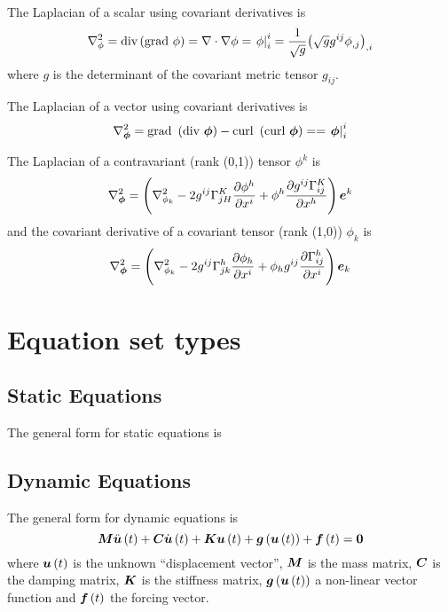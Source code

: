 The Laplacian of a scalar using covariant derivatives is
\begin{equation}
  \laplacian{\phi}=\text{div}\pbrac{\text{grad }\phi}=\divergence{}{\gradient{}{\phi}}=\mixedderiv{\phi}{i}{i}=\frac{1}{\sqrt{g}}\partialderiv{\pbrac{\sqrt{g}g^{ij}\partialderiv{\phi}{j}}}{i}
\end{equation}
where $g$ is the determinant of the covariant metric tensor $g_{ij}$.

The Laplacian of a vector using covariant derivatives is
\begin{equation}
  \laplacian{\vectr{\phi}}=\text{grad }\pbrac{\text{div }\vectr{\phi}}-\text{curl } \pbrac{\text{curl }\vectr{\phi}}==\mixedderiv{\vectr{\phi}}{i}{i}
\end{equation}

The Laplacian of a contravariant (rank (0,1)) tensor $\phi^{k}$ is
\begin{equation}
  \laplacian{\vectr{\phi}}=\pbrac{\laplacian{\phi_{k}}-2g^{ij}\christoffel{K}{j}{H}\delby{\phi^{h}}{x^{i}}+\phi^{h}\delby{g^{ij}\christoffel{K}{i}{j}}{x^{h}}}\vectr{e}^{k}
\end{equation}
and the covariant derivative of a covariant tensor  (rank (1,0)) $\phi_{k}$ is
\begin{equation}
  \laplacian{\vectr{\phi}}=\pbrac{\laplacian{\phi_{k}}-2g^{ij}\christoffel{h}{j}{k}\delby{\phi_{h}}{x^{i}}+\phi_{h}g^{ij}\delby{\christoffel{h}{i}{j}}{x^{i}}}\vectr{e}_{k}
\end{equation}

\section{Equation set types}

\subsection{Static Equations}

The general form for static equations is

\subsection{Dynamic Equations}
\label{sec:dynamicequations}

The general form for dynamic equations is
\begin{equation}
  \matr{M}\fnof{\ddot{\vectr{u}}}{t}+\matr{C}\fnof{\dot{\vectr{u}}}{t}+\matr{K}\fnof{\vectr{u}}{t}+
  \fnof{\vectr{g}}{\fnof{\vectr{u}}{t}}+\fnof{\vectr{f}}{t}=\vectr{0}
  \label{eqn:generaldynamicnonlinear}
\end{equation}
where $  \boldsymbol{u} \left( t \right) $ is the unknown ``displacement vector'', $\matr{M}$
is the mass matrix, $\matr{C}$ is the damping matrix, $\matr{K}$ is the
stiffness matrix, $  \boldsymbol{g} \left(   \boldsymbol{u} \left( t \right)  \right) $ a non-linear vector
function and $  \boldsymbol{f} \left( t \right) $ the forcing vector.

